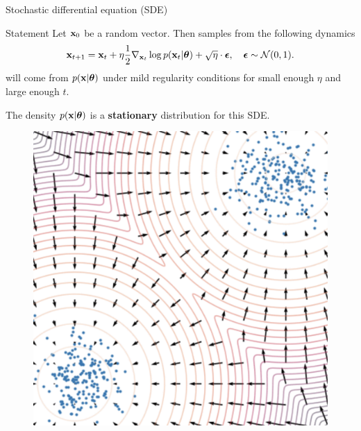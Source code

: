 \begin{frame}{Stochastic differential equation (SDE)}
	\vspace{-0.4cm}
	\begin{block}{Statement}
		Let $\mathbf{x}_0$ be a random vector. Then samples from the following dynamics
		\[
			\mathbf{x}_{t + 1} = \mathbf{x}_t + \eta \frac{1}{2} \nabla_{\mathbf{x}_t} \log p(\mathbf{x}_t | \boldsymbol{\theta}) + \sqrt{\eta} \cdot \boldsymbol{\epsilon}, \quad \boldsymbol{\epsilon} \sim \mathcal{N}(0, 1).
		\]
		will come from $p(\mathbf{x} | \boldsymbol{\theta})$ under mild regularity conditions for small enough $\eta$ and large enough $t$.
	\end{block}
	\begin{minipage}{0.6\linewidth}
		The density $p(\mathbf{x} | \boldsymbol{\theta})$ is a \textbf{stationary} distribution for this SDE.
	\end{minipage}%
	\begin{minipage}{0.35\linewidth}
		\vspace{-0.2cm}
		\begin{figure}
			\centering
			\includegraphics[width=0.9\linewidth]{figs/langevin_dynamic}
		\end{figure}
	\end{minipage}
	\end{frame}
